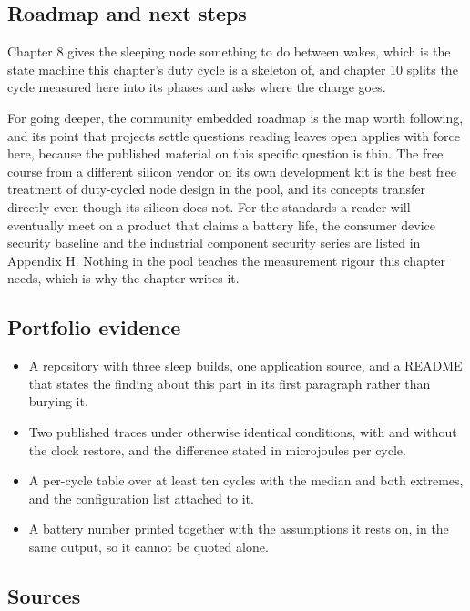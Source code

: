 \subsection*{Roadmap and next steps}

Chapter 8 gives the sleeping node something to do between wakes, which is the
state machine this chapter's duty cycle is a skeleton of, and chapter 10 splits
the cycle measured here into its phases and asks where the charge goes.

For going deeper, the community embedded roadmap is the map worth following,
and its point that projects settle questions reading leaves open applies with
force here, because the published material on this specific question is thin.
The free course from a different silicon vendor on its own development kit is
the best free treatment of duty-cycled node design in the pool, and its
concepts transfer directly even though its silicon does not. For the standards a
reader will eventually meet on a product that claims a battery life, the
consumer device security baseline and the industrial component security series
are listed in Appendix H. Nothing in the pool teaches the measurement rigour
this chapter needs, which is why the chapter writes it.

\subsection*{Portfolio evidence}

\begin{itemize}
\item A repository with three sleep builds, one application source, and a
README that states the finding about this part in its first paragraph rather
than burying it.
\item Two published traces under otherwise identical conditions, with and
without the clock restore, and the difference stated in microjoules per cycle.
\item A per-cycle table over at least ten cycles with the median and both
extremes, and the configuration list attached to it.
\item A battery number printed together with the assumptions it rests on, in the
same output, so it cannot be quoted alone.
\end{itemize}

\subsection*{Sources}

